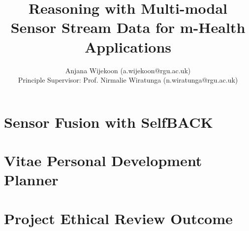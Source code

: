 \documentclass[11pt]{article}
\begin{document}


\title{Reasoning with Multi-modal Sensor Stream Data for m-Health Applications}
\author{
Anjana Wijekoon (a.wijekoon@rgu.ac.uk) \\ 
Principle Supervisor: Prof. Nirmalie Wiratunga (n.wiratunga@rgu.ac.uk)}
\date{}
\maketitle 






\clearpage










\clearpage



\clearpage

\begin{appendices}

\section{Sensor Fusion with SelfBACK}
\label{appendix:selfback}


\section{Vitae Personal Development Planner}
\label{appendix:vitae}


\section{Project Ethical Review Outcome}
\label{appendix:ethics}


\end{appendices}
\end{document}
